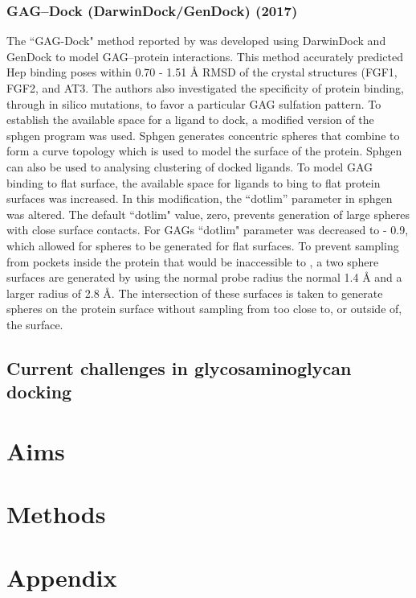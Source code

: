 \documentclass[journal=jctcce,manuscript=article]{achemso}
\begin{document}
{\subsubsection{GAG--Dock (DarwinDock/GenDock) (2017)}
The ``GAG-Dock" method reported by
\citeauthor{Griffith2017PredictingGrowth}\cite{Griffith2017PredictingGrowth} was developed using DarwinDock and GenDock to model GAG--protein interactions. This method accurately predicted \ac{Hep} binding poses within 0.70 - 1.51 \r{A} \ac{RMSD} of the crystal structures (\ac{FGF1}, \ac{FGF2}, and \ac{AT3}. The authors also investigated the specificity of protein binding, through in silico mutations, to favor a particular GAG sulfation pattern. 
To establish the available space for a ligand to dock, a modified version of the sphgen program\cite{Moustakas2006Development5} was used. Sphgen generates concentric spheres that combine to form a curve topology which is used to model the surface of the protein. 
Sphgen can also be used to analysing clustering of docked ligands.\cite{Hendrix1998SurfaceDocking.}
To model \ac{GAG} binding to flat surface, the available space for ligands to bing to flat protein surfaces was increased. In this modification, the “dotlim” parameter in sphgen was altered. The default ``dotlim" value, zero, prevents generation of large spheres with close surface contacts.\cite{Hendrix1998SurfaceDocking.} For \acp{GAG} ``dotlim" parameter was decreased to - 0.9, which allowed for spheres to be generated for flat surfaces.\cite{Griffith2017PredictingGrowth} To prevent sampling from pockets inside the protein that would be inaccessible to , a two sphere surfaces are generated by using the normal probe radius the normal 1.4 \r{A} and a larger radius of 2.8 \r{A}. The intersection of these surfaces is taken to generate spheres on the protein surface without sampling from too close to, or outside of, the surface.\cite{Griffith2017PredictingGrowth} 

\subsection{Current challenges in glycosaminoglycan docking}

\pagebreak
\section{Aims}

\section{Methods}


}
\newpage
{

}
\newpage
\section{Appendix}
\end{document}
